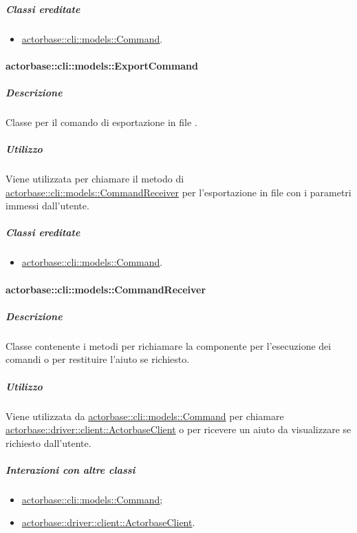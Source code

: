 \documentclass{scalatekids-article}
\begin{document}
\subparagraph{Classi ereditate}

\begin{itemize}
\item \hyperref[sec:actorbase::cli::models::Command]{actorbase::cli::models::Command}.
\end{itemize}

\paragraph{actorbase::cli::models::ExportCommand}
\label{sec:actorbase::cli::models::ExportCommand}

\subparagraph{Descrizione}

Classe per il comando di esportazione in file .

\subparagraph{Utilizzo}

Viene utilizzata per chiamare il metodo di
\hyperref[sec:actorbase::cli::models::CommandReceiver]{actorbase::cli::models::CommandReceiver} per l'esportazione in file
 con i parametri immessi dall'utente.

\subparagraph{Classi ereditate}

\begin{itemize}
\item \hyperref[sec:actorbase::cli::models::Command]{actorbase::cli::models::Command}.
\end{itemize}

\paragraph{actorbase::cli::models::CommandReceiver}
\label{sec:actorbase::cli::models::CommandReceiver}

\subparagraph{Descrizione}

Classe contenente i metodi per richiamare la componente  per
l'esecuzione dei comandi o per restituire l'aiuto se richiesto.

\subparagraph{Utilizzo}

Viene utilizzata da \hyperref[sec:actorbase::cli::models::Command]{actorbase::cli::models::Command} per chiamare
\hyperref[sec:actorbase::driver::client::ActorbaseClient]{actorbase::driver::client::ActorbaseClient} o per ricevere un aiuto da
visualizzare se richiesto dall'utente.

\subparagraph{Interazioni con altre classi}

\begin{itemize}
\item \hyperref[sec:actorbase::cli::models::Command]{actorbase::cli::models::Command};
\item \hyperref[sec:actorbase::driver::client::ActorbaseClient]{actorbase::driver::client::ActorbaseClient}.
\end{itemize}
\end{document}
